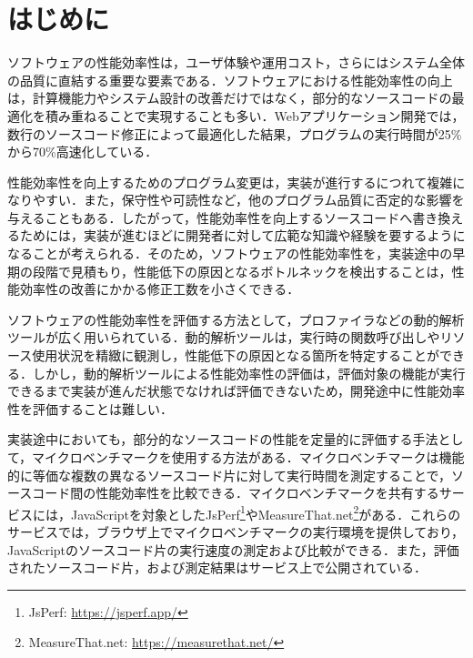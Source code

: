 \documentclass[submit,techrep,noauthor]{ipsj}
\begin{document}
\maketitle

\section{はじめに}

 ソフトウェアの性能効率性は，ユーザ体験や運用コスト，さらにはシステム全体の品質に直結する重要な要素である\cite{performance1}\cite{performance2}\cite{negative}．ソフトウェアにおける性能効率性の向上は，計算機能力やシステム設計の改善だけではなく，部分的なソースコードの最適化を積み重ねることで実現することも多い．Webアプリケーション開発では，数行のソースコード修正によって最適化した結果，プログラムの実行時間が25\%から70\%高速化している\cite{jsRefac}．

性能効率性を向上するためのプログラム変更は，実装が進行するにつれて複雑になりやすい\cite{complicate}．また，保守性や可読性など，他のプログラム品質に否定的な影響を与えることもある\cite{negative}．したがって，性能効率性を向上するソースコードへ書き換えるためには，実装が進むほどに開発者に対して広範な知識や経験を要するようになることが考えられる．そのため，ソフトウェアの性能効率性を，実装途中の早期の段階で見積もり，性能低下の原因となるボトルネックを検出することは，性能効率性の改善にかかる修正工数を小さくできる．

ソフトウェアの性能効率性を評価する方法として，プロファイラなどの動的解析ツールが広く用いられている．動的解析ツールは，実行時の関数呼び出しやリソース使用状況を精緻に観測し，性能低下の原因となる箇所を特定することができる．しかし，動的解析ツールによる性能効率性の評価は，評価対象の機能が実行できるまで実装が進んだ状態でなければ評価できないため，開発途中に性能効率性を評価することは難しい．

実装途中においても，部分的なソースコードの性能を定量的に評価する手法として，マイクロベンチマークを使用する方法がある．マイクロベンチマークは機能的に等価な複数の異なるソースコード片に対して実行時間を測定することで，ソースコード間の性能効率性を比較できる．マイクロベンチマークを共有するサービスには，JavaScriptを対象としたJsPerf\footnote{JsPerf: \url{https://jsperf.app/}}やMeasureThat.net\footnote{MeasureThat.net: \url{https://measurethat.net/}}がある．これらのサービスでは，ブラウザ上でマイクロベンチマークの実行環境を提供しており，JavaScriptのソースコード片の実行速度の測定および比較ができる．また，評価されたソースコード片，および測定結果はサービス上で公開されている．
\end{document}
